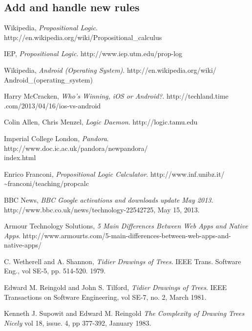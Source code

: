 \documentclass{report}
\begin{document}
\subsection{Add and handle new rules}

\begin{thebibliography}{9}

  Wikipedia,
  \emph{Propositional Logic}.
  http://en.wikipedia.org/wiki/Propositional\_calculus

  IEP,
  \emph{Propositional Logic}.
  http://www.iep.utm.edu/prop-log

  Wikipedia,
  \emph{Android (Operating System)}.
  http://en.wikipedia.org/wiki/\\Android\_(operating\_system)

  Harry McCracken,
  \emph{Who’s Winning, iOS or Android?}.
  http://techland.time\\.com/2013/04/16/ios-vs-android

  Colin Allen, Chris Menzel,
  \emph{Logic Daemon}.
  http://logic.tamu.edu

  Imperial College London,
  \emph{Pandora}.
  http://www.doc.ic.ac.uk/pandora/newpandora/\\index.html

  Enrico Franconi,
  \emph{Propositional Logic Calculator}.
  http://www.inf.unibz.it/\\\textasciitilde franconi/teaching/propcalc

  BBC News,
  \emph{BBC Google activations and downloads update May 2013}. 
  http://www.bbc.co.uk/news/technology-22542725,
  May 15, 2013.

  Armour Technology Solutions,
  \emph{5 Main Differences Between Web Apps and Native Apps}.
  http://www.armourts.com/5-main-differences-between-web-apps-and-native-apps/

  C. Wetherell and A. Shannon,
  \emph{Tidier Drawings of Trees}.
  IEEE Trans. Software Eng., 
  vol SE-5, pp. 514-520.
  1979.

  Edward M. Reingold and John S. Tilford,
  \emph{Tidier Drawings of Trees}.
  IEEE Transactions on Software Engineering, 
  vol SE-7, no. 2,
  March 1981.

  Kenneth J. Supowit and Edward M. Reingold
  \emph{The Complexity of Drawing Trees Nicely}
  vol 18, issue. 4, pp 377-392,
  January 1983.


\end{thebibliography}
\end{document}
